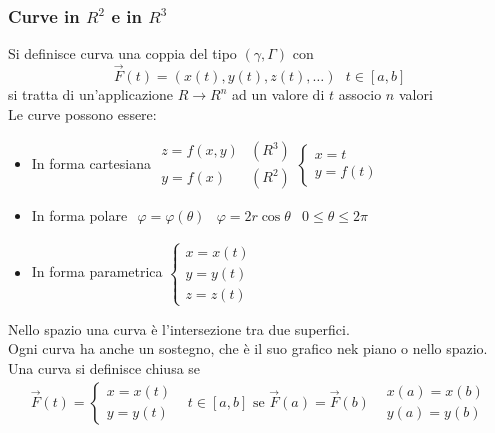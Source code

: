 \subsubsection{Curve in $R^2$ e in $R^3$}
\begin{defi}
	Si definisce {\color{red}curva} una coppia del tipo $(\gamma,\Gamma)$ con
	\begin{equation*}
		\vec{F}(t)=(x(t),y(t),z(t),\dots) \text{ } t\in [a,b]
	\end{equation*}
	si tratta di un'applicazione $R\to R^n$ ad un valore di $t$ associo $n$
	valori\\
	Le curve possono essere:
	\begin{itemize}
		\item In forma cartesiana $\begin{matrix}
				z=f(x,y) &(R^3) \\
				y=f(x) &(R^2)
		\end{matrix} \begin{cases}
			x=t\\
			y=f(t)
		\end{cases}$
		\item In forma polare $\begin{matrix}
			\varphi =\varphi(\theta)&\varphi=2r\cos\theta & 0\leq \theta \leq 2\pi
	\end{matrix}$
		\item In forma parametrica $\begin{cases}
			x=x(t)\\
			y=y(t)\\
			z=z(t)
		\end{cases}$
	\end{itemize}
	Nello spazio una curva è l'intersezione tra due superfici.\\
	Ogni curva ha anche un {\color{red}sostegno}, che è il suo grafico nek
	piano o nello spazio.\\
	Una curva si definisce {\color{red}chiusa} se
	\begin{equation*}
		\begin{matrix}
			\vec{F}(t)=\begin{cases}
				x=x(t)\\
				y=y(t)
			\end{cases} & t\in [a,b]\text{ se } \vec{F}(a)=\vec{F}(b) &
			\begin{matrix}
				x(a)=x(b)\\
				y(a)=y(b)
			\end{matrix}
		\end{matrix}

\end{equation*}
\end{defi}
